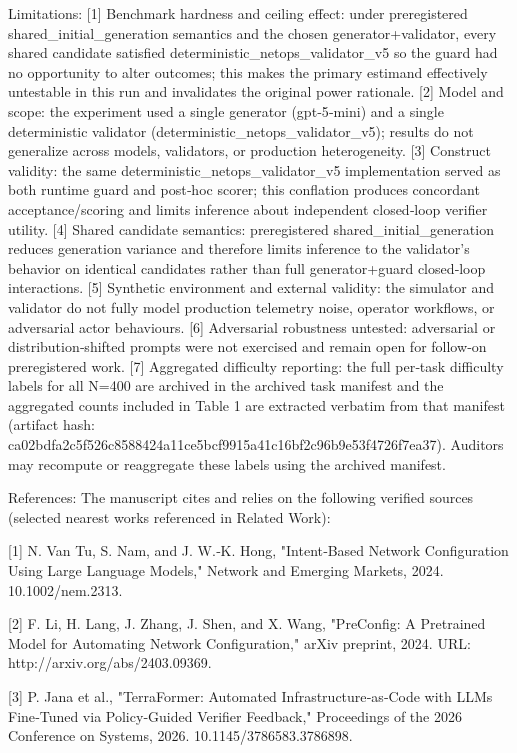 \documentclass[conference]{IEEEtran}
\begin{document}
Limitations: [1] Benchmark hardness and ceiling effect: under preregistered shared\_initial\_generation semantics and the chosen generator+validator, every shared candidate satisfied deterministic\_netops\_validator\_v5 so the guard had no opportunity to alter outcomes; this makes the primary estimand effectively untestable in this run and invalidates the original power rationale. [2] Model and scope: the experiment used a single generator (gpt‑5‑mini) and a single deterministic validator (deterministic\_netops\_validator\_v5); results do not generalize across models, validators, or production heterogeneity. [3] Construct validity: the same deterministic\_netops\_validator\_v5 implementation served as both runtime guard and post‑hoc scorer; this conflation produces concordant acceptance/scoring and limits inference about independent closed‑loop verifier utility. [4] Shared candidate semantics: preregistered shared\_initial\_generation reduces generation variance and therefore limits inference to the validator's behavior on identical candidates rather than full generator+guard closed‑loop interactions. [5] Synthetic environment and external validity: the simulator and validator do not fully model production telemetry noise, operator workflows, or adversarial actor behaviours. [6] Adversarial robustness untested: adversarial or distribution‑shifted prompts were not exercised and remain open for follow‑on preregistered work. [7] Aggregated difficulty reporting: the full per‑task difficulty labels for all N=400 are archived in the archived task manifest and the aggregated counts included in Table 1 are extracted verbatim from that manifest (artifact hash: ca02bdfa\allowbreak{}2c5f526c\allowbreak{}8588424a\allowbreak{}11ce5bcf\allowbreak{}9915a41c\allowbreak{}16bf2c96\allowbreak{}b9e53f47\allowbreak{}26f7ea37). Auditors may recompute or reaggregate these labels using the archived manifest.

References: The manuscript cites and relies on the following verified sources (selected nearest works referenced in Related Work):

[1] N. Van Tu, S. Nam, and J. W.‑K. Hong, "Intent‑Based Network Configuration Using Large Language Models," Network and Emerging Markets, 2024. 10.1002/nem.2313.

[2] F. Li, H. Lang, J. Zhang, J. Shen, and X. Wang, "PreConfig: A Pretrained Model for Automating Network Configuration," arXiv preprint, 2024. URL: http://arxiv.org/abs/2403.09369.

[3] P. Jana et al., "TerraFormer: Automated Infrastructure‑as‑Code with LLMs Fine‑Tuned via Policy‑Guided Verifier Feedback," Proceedings of the 2026 Conference on Systems, 2026. 10.1145/3786583.3786898.
\end{document}
